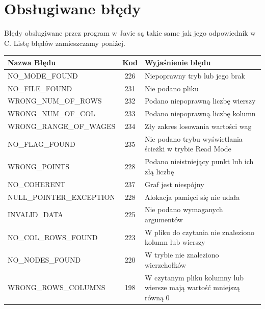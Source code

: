 \documentclass[10pt, a4paper]{report}
\begin{document}
    \section{Obsługiwane błędy}
    Błędy obslugiwane przez program w Javie są takie same jak jego odpowiednik w C. Listę błędów zamieszczamy poniżej.
    \newline \begin{tabularx}{\textwidth}{ l|c|X } 
        \hline Nazwa Błędu & Kod & Wyjaśnienie błędu\\ 
        \hline NO\_MODE\_FOUND & 226 & Niepoprawny tryb lub jego brak\\
        \hline NO\_FILE\_FOUND & 231 & Nie podano pliku\\ 
        \hline WRONG\_NUM\_OF\_ROWS & 232 & Podano niepoprawną liczbę wierszy\\
        \hline WRONG\_NUM\_OF\_COL & 233 & Podano niepoprawną liczbę kolumn\\
        \hline WRONG\_RANGE\_OF\_WAGES & 234 & Zły zakres losowania wartości wag\\
        \hline NO\_FLAG\_FOUND & 235 & Nie podano trybu wyświetlania ścieżki w trybie Read Mode\\
        \hline WRONG\_POINTS & 228 & Podano nieistniejący punkt lub ich złą liczbę\\
        \hline NO\_COHERENT & 237 & Graf jest niespójny \\
        \hline NULL\_POINTER\_EXCEPTION & 228 & Alokacja pamięci się nie udała\\
        \hline INVALID\_DATA & 225 & Nie podano wymaganych argumentów\\
        \hline NO\_COL\_ROWS\_FOUND & 223 & W pliku do czytania nie znaleziono kolumn lub wierszy\\
        \hline NO\_NODES\_FOUND & 220 & W trybie nie znaleziono wierzchołków\\
        \hline WRONG\_ROWS\_COLUMNS & 198 & W czytanym pliku kolumny lub wiersze mają wartość mniejszą równą 0\\
        \hline
    \end{tabularx}
\end{document}

